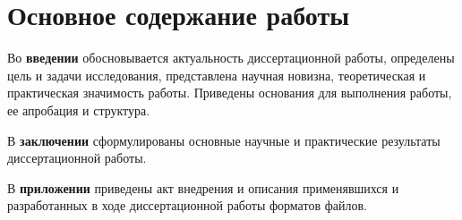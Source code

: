 
\section*{Основное содержание работы}
Во {\bf введении}
обосновывается актуальность диссертационной работы,
определены цель и задачи исследования,
представлена научная новизна, теоретическая и практическая значимость работы.
Приведены основания для выполнения работы, ее апробация и структура.







В {\bf заключении}
сформулированы основные научные и практические результаты
диссертационной работы.

В {\bf приложении}
приведены
акт внедрения
и описания применявшихся
и разработанных
в ходе диссертационной работы
форматов файлов.

